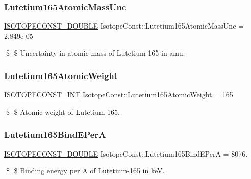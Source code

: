 \subsubsection{\texorpdfstring{Lutetium165\+Atomic\+Mass\+Unc}{Lutetium165AtomicMassUnc}}
{\footnotesize\ttfamily \mbox{\hyperlink{group___isotope_const-_macros_ga8f45a7272ce02c0b4c65c44636ed719a}{I\+S\+O\+T\+O\+P\+E\+C\+O\+N\+S\+T\+\_\+\+D\+O\+U\+B\+LE}} Isotope\+Const\+::\+Lutetium165\+Atomic\+Mass\+Unc = 2.\+849e-\/05}

\$ \$ Uncertainty in atomic mass of Lutetium-\/165 in amu. \mbox{\label{group___isotope_const-_lutetium-_lu165_gac38728be9328f273e8bd59e74cf05598}} 
\subsubsection{\texorpdfstring{Lutetium165\+Atomic\+Weight}{Lutetium165AtomicWeight}}
{\footnotesize\ttfamily \mbox{\hyperlink{group___isotope_const-_macros_ga5f18360b3e99483a35c32d789e62621c}{I\+S\+O\+T\+O\+P\+E\+C\+O\+N\+S\+T\+\_\+\+I\+NT}} Isotope\+Const\+::\+Lutetium165\+Atomic\+Weight = 165}

\$ \$ Atomic weight of Lutetium-\/165. \mbox{\label{group___isotope_const-_lutetium-_lu165_ga502d53c557f720f4a093b6101be2e262}} 
\subsubsection{\texorpdfstring{Lutetium165\+Bind\+E\+PerA}{Lutetium165BindEPerA}}
{\footnotesize\ttfamily \mbox{\hyperlink{group___isotope_const-_macros_ga8f45a7272ce02c0b4c65c44636ed719a}{I\+S\+O\+T\+O\+P\+E\+C\+O\+N\+S\+T\+\_\+\+D\+O\+U\+B\+LE}} Isotope\+Const\+::\+Lutetium165\+Bind\+E\+PerA = 8076.}

\$ \$ Binding energy per A of Lutetium-\/165 in keV. \mbox{\label{group___isotope_const-_lutetium-_lu165_ga44fe50e9b0806d6dcbbe2a97f3c11a2e}} 
